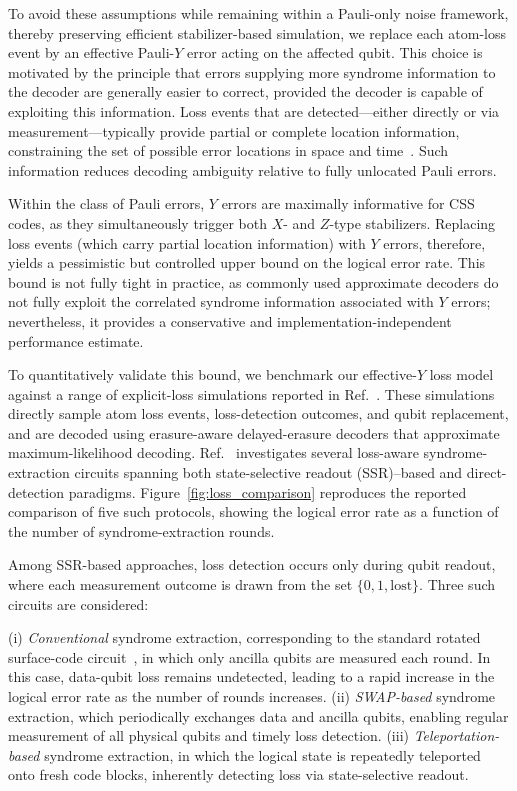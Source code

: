 \documentclass[aps, prx, reprint, superscriptaddress, longbibliography, floatfix]{revtex4-2}
\begin{document}
To avoid these assumptions while remaining within a Pauli-only noise framework, thereby preserving efficient stabilizer-based simulation, we replace each atom-loss event by an effective Pauli-$Y$ error acting on the affected qubit. This choice is motivated by the principle that errors supplying more syndrome information to the decoder are generally easier to correct, provided the decoder is capable of exploiting this information. Loss events that are detected—either directly or via measurement—typically provide partial or complete location information, constraining the set of possible error locations in space and time~\cite{baranes2025}. Such information reduces decoding ambiguity relative to fully unlocated Pauli errors.

Within the class of Pauli errors, $Y$ errors are maximally informative for CSS codes, as they simultaneously trigger both $X$- and $Z$-type stabilizers. Replacing loss events (which carry partial location information) with $Y$ errors, therefore, yields a pessimistic but controlled upper bound on the logical error rate. This bound is not fully tight in practice, as commonly used approximate decoders do not fully exploit the correlated syndrome information associated with $Y$ errors; nevertheless, it provides a conservative and implementation-independent performance estimate.

To quantitatively validate this bound, we benchmark our effective-$Y$ loss model against a range of explicit-loss simulations reported in Ref.~\cite{baranes2025}. These simulations directly sample atom loss events, loss-detection outcomes, and qubit replacement, and are decoded using erasure-aware delayed-erasure decoders that approximate maximum-likelihood decoding. Ref.~\cite{baranes2025} investigates several loss-aware syndrome-extraction circuits spanning both state-selective readout (SSR)–based and direct-detection paradigms. Figure~\ref{fig:loss_comparison} reproduces the reported comparison of five such protocols, showing the logical error rate as a function of the number of syndrome-extraction rounds.

Among SSR-based approaches, loss detection occurs only during qubit readout, where each measurement outcome is drawn from the set $\{0,1,\text{lost}\}$. Three such circuits are considered:

(i) \emph{Conventional} syndrome extraction, corresponding to the standard rotated surface-code circuit~\cite{Horsman2012}, in which only ancilla qubits are measured each round. In this case, data-qubit loss remains undetected, leading to a rapid increase in the logical error rate as the number of rounds increases.
(ii) \emph{SWAP-based} syndrome extraction, which periodically exchanges data and ancilla qubits, enabling regular measurement of all physical qubits and timely loss detection.
(iii) \emph{Teleportation-based} syndrome extraction, in which the logical state is repeatedly teleported onto fresh code blocks, inherently detecting loss via state-selective readout.
\end{document}

